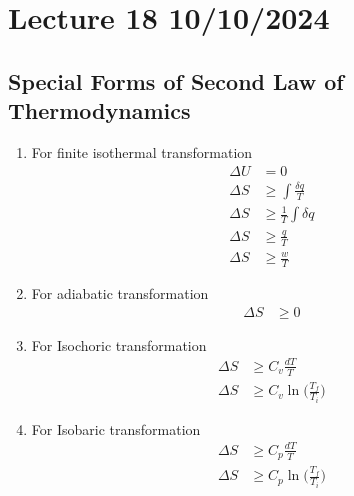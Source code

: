 \documentclass[fleqn,10pt]{SelfArx} %
\begin{document}
\clearpage

\section{Lecture 18 10/10/2024}
\subsection{Special Forms of Second Law of Thermodynamics}

\begin{enumerate}
    \item For finite isothermal transformation
            \begin{align}
                \Delta U &= 0 \\
                \Delta S &\geq \int \frac{\delta q}{T} \\
                \Delta S &\geq \frac{1}{T} \int \delta q \\
                \Delta S &\geq \frac{q}{T} \\
                \Delta S &\geq \frac{w}{T}
            \end{align}

    \item For adiabatic transformation
            \begin{align}
                \Delta S &\geq 0
            \end{align}

    \item For Isochoric transformation
            \begin{align}
                \Delta S &\geq C_v \frac{d T}{T} \\
                \Delta S &\geq C_v \ln\Big(\frac{T_f}{T_i}\Big)
            \end{align}

    \item For Isobaric transformation
            \begin{align}
                \Delta S &\geq C_p \frac{d T}{T} \\
                \Delta S &\geq C_p \ln\Big(\frac{T_f}{T_i}\Big)
            \end{align}


\end{enumerate}
\end{document}
